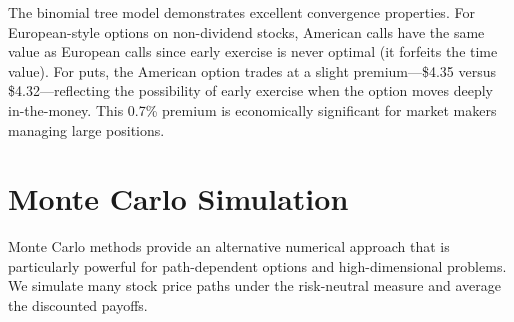 \documentclass[a4paper, 11pt]{article}
\begin{document}
The binomial tree model demonstrates excellent convergence properties. For European-style options on non-dividend stocks, American calls have the same value as European calls since early exercise is never optimal (it forfeits the time value). For puts, the American option trades at a slight premium—\$4.35 versus \$4.32—reflecting the possibility of early exercise when the option moves deeply in-the-money. This 0.7\% premium is economically significant for market makers managing large positions.

\section{Monte Carlo Simulation}

Monte Carlo methods provide an alternative numerical approach that is particularly powerful for path-dependent options and high-dimensional problems. We simulate many stock price paths under the risk-neutral measure and average the discounted payoffs.
\end{document}
